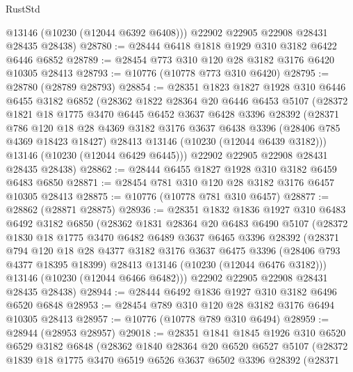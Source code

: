 \begin{lexlean}{RustStd}
\begin{coremodule}
        @13146
        (@10230 (@12044 @6392 @6408)))
      @22902
      @22905
      @22908
      @28431
      @28435
      @28438)
@28780 := @28444 @6418 @1818 @1929 @310 @3182 @6422 @6446 @6852
@28789 := @28454 @773 @310 @120 @28 @3182 @3176 @6420 @10305 @28413
@28793 := @10776 (@10778 @773 @310 @6420)
@28795 := @28780 (@28789 @28793)
@28854 := @28351
    @1823
    @1827
    @1928
    @310
    @6446
    @6455
    @3182
    @6852
    (@28362
      @1822
      @28364
      @20
      @6446
      @6453
      @5107
      (@28372
        @1821
        @18
        @1775
        @3470
        @6445
        @6452
        @3637
        @6428
        @3396
        @28392
        (@28371
          @786
          @120
          @18
          @28
          @4369
          @3182
          @3176
          @3637
          @6438
          @3396
          (@28406 @785 @4369 @18423 @18427)
          @28413
          @13146
          (@10230 (@12044 @6439 @3182)))
        @13146
        (@10230 (@12044 @6429 @6445)))
      @22902
      @22905
      @22908
      @28431
      @28435
      @28438)
@28862 := @28444 @6455 @1827 @1928 @310 @3182 @6459 @6483 @6850
@28871 := @28454 @781 @310 @120 @28 @3182 @3176 @6457 @10305 @28413
@28875 := @10776 (@10778 @781 @310 @6457)
@28877 := @28862 (@28871 @28875)
@28936 := @28351
    @1832
    @1836
    @1927
    @310
    @6483
    @6492
    @3182
    @6850
    (@28362
      @1831
      @28364
      @20
      @6483
      @6490
      @5107
      (@28372
        @1830
        @18
        @1775
        @3470
        @6482
        @6489
        @3637
        @6465
        @3396
        @28392
        (@28371
          @794
          @120
          @18
          @28
          @4377
          @3182
          @3176
          @3637
          @6475
          @3396
          (@28406 @793 @4377 @18395 @18399)
          @28413
          @13146
          (@10230 (@12044 @6476 @3182)))
        @13146
        (@10230 (@12044 @6466 @6482)))
      @22902
      @22905
      @22908
      @28431
      @28435
      @28438)
@28944 := @28444 @6492 @1836 @1927 @310 @3182 @6496 @6520 @6848
@28953 := @28454 @789 @310 @120 @28 @3182 @3176 @6494 @10305 @28413
@28957 := @10776 (@10778 @789 @310 @6494)
@28959 := @28944 (@28953 @28957)
@29018 := @28351
    @1841
    @1845
    @1926
    @310
    @6520
    @6529
    @3182
    @6848
    (@28362
      @1840
      @28364
      @20
      @6520
      @6527
      @5107
      (@28372
        @1839
        @18
        @1775
        @3470
        @6519
        @6526
        @3637
        @6502
        @3396
        @28392
        (@28371

\end{coremodule}
\end{lexlean}
